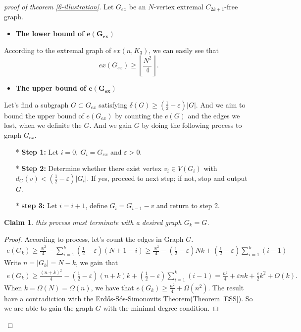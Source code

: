 \documentclass{article}
\newtheorem{claim}[theorem]{Claim}
\theoremstyle{definition}
\def\Erdos{Erd\H{o}s}
\renewcommand{\epsilon}{\varepsilon}
\begin{document}
\begin{proof}[proof of theorem \ref{6-illustration}]
Let $G_{ex}$ be an $N$-vertex extremal $C_{2k+1}$-free graph. 
\begin{itemize}
    \item \textbf{The lower bound of $\boldsymbol{e(G_{ex})}$}
\end{itemize}
According to the extremal graph of $ex(n,K_3)$, we can easily see that 
$$ex(G_{ex}) \ge \left \lfloor \frac{N^2}{4} \right \rfloor.$$
\begin{itemize}
    \item \textbf{The upper bound of $\boldsymbol{e(G_{ex})}$}
\end{itemize}

Let's find a subgraph $G \subset G_{ex}$ satisfying $\delta(G) \ge (\frac{1}{2}-\epsilon)|G|$. And we aim to bound the upper bound of $e(G_{ex})$ by counting the $e(G)$ and the edges we lost, when we definite the $G$. And we gain $G$ by doing the following process to graph $G_{ex}$.
\begin{itemize}
    \item[*] \textbf{Step 1:} Let $i=0,~G_i=G_{ex}$ and $\epsilon > 0$.

    \item[*] \textbf{Step 2:} Determine whether there exist vertex $v_i \in V(G_i)$ with $d_G(v)<(\frac{1}{2}-\epsilon)|G_i|$. If yes, proceed to next step; if not, stop and output $G$.
    
    \item[*] \textbf{step 3:} Let $i=i+1$, define $G_i=G_{i-1}-v$ and return to step 2.
\end{itemize}

\begin{claim}\label{claimofprcess}
    this process must terminate with a desired graph $G_k=G$.
\end{claim}

\begin{proof}
According to process, let's count the edges in Graph $G$.
\begin{align*}
e(G_k) \ge \frac{N^2}{4}-\sum_{i=1}^{k}(\frac{1}{2}-\epsilon)(N+1-i) \ge \frac{N^2}{4}-(\frac{1}{2}-\epsilon)Nk+(\frac{1}{2}-\epsilon)\sum_{i=1}^{k}(i-1)
\end{align*}
Write $n=|G_k|=N-k$, we gain that
\begin{align*}
e(G_k) \ge \frac{(n+k)^2}{4}-(\frac{1}{2}-\epsilon)(n+k)k+(\frac{1}{2}-\epsilon)\sum_{i=1}^{k}(i-1) = \frac{n^2}{4}+\epsilon nk + \frac{\epsilon}{2}k^2+O(k).
\end{align*}
When $k=\Omega(N)=\Omega(n)$, we have that $e(G_k) \ge \frac{n^2}{4}+\Omega(n^2)$. The result have a contradiction with the \Erdos{}-S\'os-Simonovits Theorem(Theorem \ref{ESS}). So we are able to gain the graph $G$ with the minimal degree condition.
\end{proof}


\end{proof}
\end{document}
